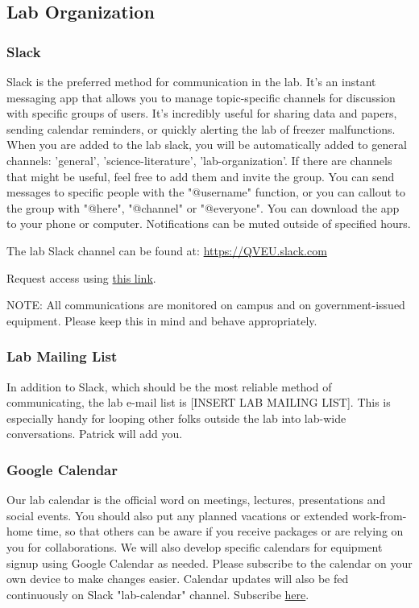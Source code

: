 \documentclass[10pt, a4paper, twocolumn]{article} %
\begin{document}
\subsection{Lab Organization}
\subsubsection{Slack}
Slack is the preferred method for communication in the lab. It's an instant messaging app that allows you to manage topic-specific channels for discussion with specific groups of users. It’s incredibly useful for sharing data and papers, sending calendar reminders, or quickly alerting the lab of freezer malfunctions. When you are added to the lab slack, you will be automatically added to general channels: 'general', 'science-literature', 'lab-organization'. If there are channels that might be useful, feel free to add them and invite the group. You can send messages to specific people with the "@username" function, or you can callout to the group with "@here", "@channel" or "@everyone". You can download the app to your phone or computer. Notifications can be muted outside of specified hours.

The lab Slack channel can be found at: \href{https://QVEU.slack.com}{https://QVEU.slack.com}\newline

Request access using \href{https://join.slack.com/t/qveu/shared_invite/zt-sspu46d0-mJUV8OjwjOoJTaFyPKGlZg}{this link}.\newline

NOTE: All communications are monitored on campus and on government-issued equipment. Please keep this in mind and behave appropriately.

\subsubsection{Lab Mailing List}
In addition to Slack, which should be the most reliable method of communicating, the lab e-mail list is [INSERT LAB MAILING LIST]. This is especially handy for looping other folks outside the lab into lab-wide conversations. Patrick will add you.

\subsubsection{Google Calendar}
Our lab calendar is the official word on meetings, lectures, presentations and social events. You should also put any planned vacations or extended work-from-home time, so that others can be aware if you receive packages or are relying on you for collaborations. We will also develop specific calendars for equipment signup using Google Calendar as needed. Please subscribe to the calendar on your own device to make changes easier. Calendar updates will also be fed continuously on Slack "lab-calendar" channel. Subscribe \href{https://calendar.google.com/calendar/u/0?cid=dGhlcXZldUBnbWFpbC5jb20z}{here}.
\end{document}
